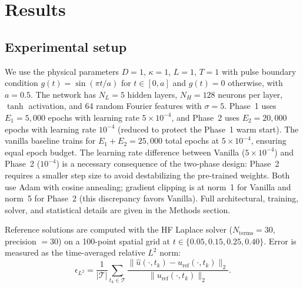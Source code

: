 \documentclass[11pt]{article}
\begin{document}
\section{Results}
\label{sec:experiments}

\subsection{Experimental setup}

We use the physical parameters $D = 1$, $\kappa = 1$, $L = 1$, $T = 1$ with pulse boundary condition $g(t) = \sin(\pi t / a)$ for $t \in [0, a]$ and $g(t) = 0$ otherwise, with $a = 0.5$. The network has $N_L = 5$ hidden layers, $N_H = 128$ neurons per layer, $\tanh$ activation, and 64 random Fourier features with $\sigma = 5$. Phase~1 uses $E_1 = 5{,}000$ epochs with learning rate $5 \times 10^{-4}$, and Phase~2 uses $E_2 = 20{,}000$ epochs with learning rate $10^{-4}$ (reduced to protect the Phase~1 warm start). The vanilla baseline trains for $E_1 + E_2 = 25{,}000$ total epochs at $5 \times 10^{-4}$, ensuring equal epoch budget. The learning rate difference between Vanilla ($5 \times 10^{-4}$) and Phase~2 ($10^{-4}$) is a necessary consequence of the two-phase design: Phase~2 requires a smaller step size to avoid destabilizing the pre-trained weights. Both use Adam with cosine annealing; gradient clipping is at norm~1 for Vanilla and norm~5 for Phase~2 (this discrepancy favors Vanilla). Full architectural, training, solver, and statistical details are given in the Methods section.

Reference solutions are computed with the HF Laplace solver ($N_{\mathrm{terms}} = 30$, precision $= 30$) on a 100-point spatial grid at $t \in \{0.05, 0.15, 0.25, 0.40\}$. Error is measured as the time-averaged relative $L^2$ norm:
\begin{equation}
\epsilon_{L^2} = \frac{1}{|\mathcal{T}|} \sum_{t_k \in \mathcal{T}} \frac{\|\hat{u}(\cdot, t_k) - u_{\mathrm{ref}}(\cdot, t_k)\|_2}{\|u_{\mathrm{ref}}(\cdot, t_k)\|_2}.
\end{equation}
\end{document}
